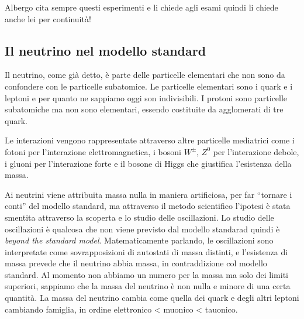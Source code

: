 


        Albergo cita sempre questi esperimenti e li chiede agli esami quindi li chiede anche lei per continuità!
    \subsection{Il neutrino nel modello standard}
        Il neutrino, come già detto, è parte delle particelle elementari che non sono da confondere con le particelle subatomice. Le particelle elementari sono i quark e i leptoni e per quanto ne sappiamo oggi son indivisibili. I protoni sono particelle subatomiche ma non sono elementari, essendo costituite da agglomerati di tre quark.

        Le interazioni vengono rappresentate attraverso altre particelle mediatrici come i fotoni per l'interazione elettromagnetica, i bosoni $W^\pm$, $Z^0$ per l'interazione debole, i gluoni per l'interazione forte e il bosone di Higgs che giustifica l'esistenza della massa.

        Ai neutrini viene attribuita massa nulla in maniera artificiosa, per far ``tornare i conti'' del modello standard, ma attraverso il metodo scientifico l'ipotesi è stata smentita attraverso la scoperta e lo studio delle oscillazioni. Lo studio delle oscillazioni è qualcosa che non viene previsto dal modello standarad quindi è \emph{beyond the standard model}. Matematicamente parlando, le oscillazioni sono interpretate come sovrapposizioni di autostati di massa distinti, e l'esistenza di massa prevede che il neutrino abbia massa, in contraddizione col modello standard. Al momento non abbiamo un numero per la massa ma solo dei limiti superiori, sappiamo che la massa del neutrino è non nulla e minore di una certa quantità. La massa del neutrino cambia come quella dei quark e degli altri leptoni cambiando famiglia, in ordine elettronico < muonico < tauonico.

